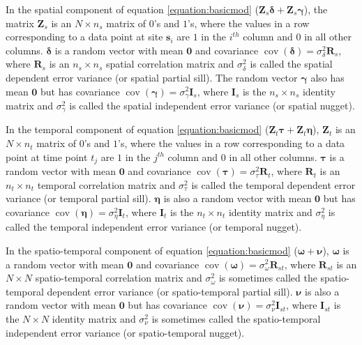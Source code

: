 \documentclass[]{interact}
\theoremstyle{plain}%
\theoremstyle{definition}
\theoremstyle{remark}
\begin{document}
In the spatial component of equation \ref{equation:basicmod}
(\(\mathbf{Z}_{s} \bm{\delta} + \mathbf{Z}_{s} \bm{\gamma}\)), the
matrix \(\mathbf{Z}_{s}\) is an \(N \times n_s\) matrix of \(0\)'s and
\(1\)'s, where the values in a row corresponding to a data point at site
\(\mathbf{s}_{i}\) are \(1\) in the \(i^{th}\) column and \(0\) in all
other columns. \(\bm{\delta}\) is a random vector with mean
\(\mathbf{0}\) and covariance
\(\mathop{\mathrm{{cov}}}(\bm{\delta}) = \sigma^2_{\delta} \mathbf{R}_{s}\),
where \(\mathbf{R}_s\) is an \(n_s \times n_s\) spatial correlation
matrix and \(\sigma^2_{\delta}\) is called the spatial dependent error
variance (or spatial partial sill). The random vector \(\bm{\gamma}\)
also has mean \(\mathbf{0}\) but has covariance
\(\mathop{\mathrm{{cov}}}(\bm{\gamma}) = \sigma^2_{\gamma} \mathbf{I}_{s}\),
where \(\mathbf{I}_s\) is the \(n_s \times n_s\) identity matrix and
\(\sigma^2_{\gamma}\) is called the spatial independent error variance
(or spatial nugget).

In the temporal component of equation \ref{equation:basicmod}
(\(\mathbf{Z}_t \bm{\tau} + \mathbf{Z}_t \bm{\eta}\)),
\(\mathbf{Z}_{t}\) is an \(N \times n_t\) matrix of \(0\)'s and \(1\)'s,
where the values in a row corresponding to a data point at time point
\(t_j\) are \(1\) in the \(j^{th}\) column and \(0\) in all other
columns. \(\bm{\tau}\) is a random vector with mean \(\mathbf{0}\) and
covariance
\(\mathop{\mathrm{{cov}}}(\bm{\tau}) = \sigma^2_{\tau} \mathbf{R}_{t}\),
where \(\mathbf{R}_t\) is an \(n_t \times n_t\) temporal correlation
matrix and \(\sigma^2_{\tau}\) is called the temporal dependent error
variance (or temporal partial sill). \(\bm{\eta}\) is also a random
vector with mean \(\mathbf{0}\) but has covariance
\(\mathop{\mathrm{{cov}}}(\bm{\eta}) = \sigma^2_{\eta} \mathbf{I}_{t}\),
where \(\mathbf{I}_t\) is the \(n_t \times n_t\) identity matrix and
\(\sigma^2_{\eta}\) is called the temporal independent error variance
(or temporal nugget).

In the spatio-temporal component of equation \ref{equation:basicmod}
(\(\bm{\omega} + \bm{\nu}\)), \(\bm{\omega}\) is a random vector with
mean \(\mathbf{0}\) and covariance
\(\mathop{\mathrm{{cov}}}(\bm{\omega}) = \sigma^2_{\omega} \mathbf{R}_{st}\),
where \(\mathbf{R}_{st}\) is an \(N \times N\) spatio-temporal
correlation matrix and \(\sigma^2_{\omega}\) is sometimes called the
spatio-temporal dependent error variance (or spatio-temporal partial
sill). \(\bm{\nu}\) is also a random vector with mean \(\mathbf{0}\) but
has covariance
\(\mathop{\mathrm{{cov}}}(\bm{\nu}) = \sigma^2_{\nu} \mathbf{I}_{st}\),
where \(\mathbf{I}_{st}\) is the \(N \times N\) identity matrix and
\(\sigma^2_{\nu}\) is sometimes called the spatio-temporal independent
error variance (or spatio-temporal nugget).
\end{document}
